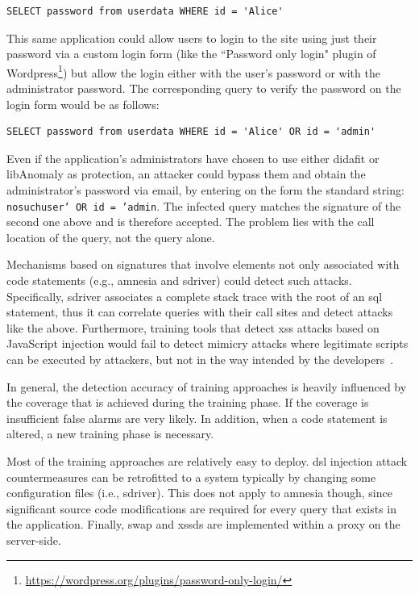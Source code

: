 \documentclass[conference]{IEEEtran}
\begin{document}
\lstset{language=SQL}
\begin{lstlisting}
SELECT password from userdata WHERE id = 'Alice'
\end{lstlisting}

\noindent
This same application could allow users to
login to the site using just their password via a custom login form
(like the ``Password only login" plugin of
Wordpress\footnote{\url{https://wordpress.org/plugins/password-only-login/}})
but allow the login either with the user's password or with
the administrator password. The corresponding query to verify
the password on the login form would be as follows:

\lstset{language=SQL}
\begin{lstlisting}
SELECT password from userdata WHERE id = 'Alice' OR id = 'admin'
\end{lstlisting}

\noindent
Even if the application's administrators have chosen to use
either {\sc didafit} or libAnomaly as protection,
an attacker could bypass them and obtain the
administrator's password via email,
by entering on the form the standard string:
{\tt nosuchuser' OR id = 'admin}. The infected query matches the
signature of the second one above and is therefore accepted.
The problem lies with the call location of the query, not the query alone.

Mechanisms based on signatures that involve elements not only
associated with code statements (e.g., {\sc amnesia} and {\sc
  sd}river) could detect such attacks. Specifically, {\sc sd}river
associates a complete stack trace with the root of an {\sc sql}
statement, thus it can correlate queries with their call sites and
detect attacks like the above. Furthermore, training
tools that detect {\sc xss} attacks based on JavaScript injection
would fail to detect mimicry attacks where legitimate scripts can be
executed by attackers, but not in the way intended by the
developers~\cite{APKLM10}.

In general, the detection accuracy of training approaches is heavily
influenced by the coverage that is achieved during the training phase. If
the coverage is insufficient false alarms are very likely. In
addition, when a code statement is altered, a new training phase is
necessary.

Most of the training approaches are relatively easy to deploy.
{\sc dsl} injection attack countermeasures
can be retrofitted to a system typically by changing
some configuration files (i.e., {\sc sd}river). This does not apply
to {\sc amnesia} though, since significant source code
modifications are required for every query that exists
in the application. Finally, {\sc swap} and {\sc xssds}
are implemented within a proxy on the server-side.
\end{document}
